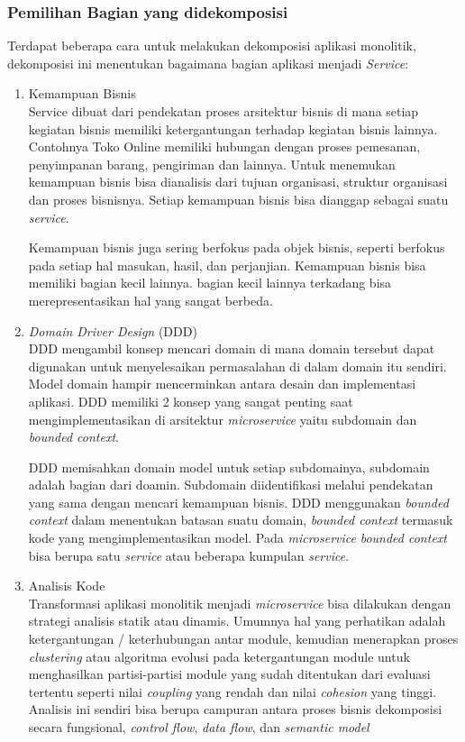 \subsubsection{Pemilihan Bagian yang didekomposisi}
Terdapat beberapa cara untuk melakukan dekomposisi aplikasi monolitik, dekomposisi ini menentukan bagaimana bagian aplikasi menjadi \textit{Service}:
\begin{enumerate}[leftmargin=1.3cm]
	\item Kemampuan Bisnis\cite{1C7}\\
		 Service dibuat dari pendekatan proses arsitektur bisnis di mana setiap kegiatan bisnis memiliki ketergantungan terhadap kegiatan bisnis lainnya. Contohnya Toko Online memiliki hubungan dengan proses pemesanan, penyimpanan barang, pengiriman dan lainnya. Untuk menemukan kemampuan bisnis bisa dianalisis dari tujuan organisasi, struktur organisasi dan proses bisnisnya. Setiap kemampuan bisnis bisa dianggap sebagai suatu \textit{service}.

		 Kemampuan bisnis juga sering berfokus pada objek bisnis, seperti berfokus pada  setiap hal masukan, hasil, dan perjanjian. Kemampuan bisnis bisa memiliki bagian kecil lainnya. bagian kecil lainnya terkadang bisa merepresentasikan hal yang sangat berbeda.
	\item \textit{Domain Driver Design} (DDD) \cite{1C7} \\
		DDD mengambil konsep mencari domain di mana domain tersebut dapat digunakan untuk menyelesaikan permasalahan di dalam domain itu sendiri. Model domain hampir mencerminkan antara desain dan implementasi aplikasi. DDD memiliki 2 konsep yang sangat penting saat mengimplementasikan di arsitektur \textit{microservice} yaitu subdomain dan \textit{bounded context}.

		DDD memisahkan domain model untuk setiap subdomainya, subdomain adalah bagian dari doamin. Subdomain diidentifikasi melalui pendekatan yang sama dengan mencari kemampuan bisnis. DDD menggunakan \textit{bounded context} dalam menentukan batasan suatu domain, \textit{bounded context} termasuk kode yang mengimplementasikan model. Pada \textit{microservice} \textit{bounded context} bisa berupa satu \textit{service} atau beberapa kumpulan \textit{service}.
	\item Analisis Kode \cite{74C,5B1}  \\
		Transformasi aplikasi monolitik menjadi \textit{microservice} bisa dilakukan dengan strategi analisis statik atau dinamis. Umumnya hal yang perhatikan adalah ketergantungan / keterhubungan antar module, kemudian menerapkan proses \textit{clustering} atau algoritma evolusi pada ketergantungan module untuk menghasilkan partisi-partisi module yang sudah ditentukan dari evaluasi tertentu seperti nilai \textit{coupling} yang rendah dan nilai \textit{cohesion} yang tinggi. Analisis ini sendiri bisa berupa campuran antara proses bisnis dekomposisi secara fungsional, \textit{control flow}, \textit{data flow}, dan \textit{semantic model}
		
\end{enumerate}	

